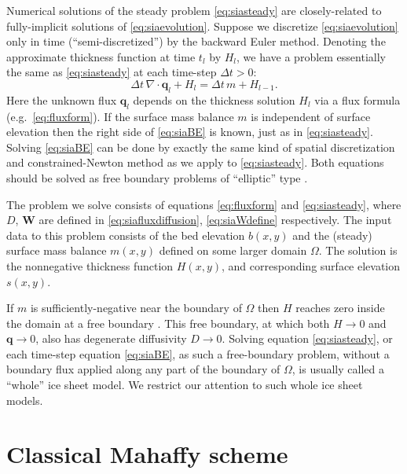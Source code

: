 \documentclass[twocolumn,letterpaper]{igs}
\newcommand\bq{\mathbf{q}}
\newcommand\bW{\mathbf{W}}
\newcommand{\Div}{\nabla\cdot}
\begin{document}
Numerical solutions of the steady problem \eqref{eq:siasteady} are closely-related to fully-implicit  solutions of \eqref{eq:siaevolution}.  Suppose we discretize \eqref{eq:siaevolution} only in time (``semi-discretized'') by the backward Euler method.  Denoting the approximate thickness function at time $t_l$ by $H_l$, we have a problem essentially the same as \eqref{eq:siasteady} at each time-step $\Delta t> 0$:
\begin{equation}
\Delta t\,\Div \bq_l + H_l = \Delta t\,m + H_{l-1}.  \label{eq:siaBE}
\end{equation}
Here the unknown flux $\bq_l$ depends on the thickness solution $H_l$ via a flux formula (e.g.~\eqref{eq:fluxform}).  If the surface mass balance $m$ is independent of surface elevation then the right side of \eqref{eq:siaBE} is known, just as in \eqref{eq:siasteady}.  Solving \eqref{eq:siaBE} can be done by exactly the same kind of spatial discretization and constrained-Newton method as we apply to \eqref{eq:siasteady}.  Both equations should be solved as free boundary problems of ``elliptic'' type \citep{JouvetBueler2012}.

The problem we solve consists of equations \eqref{eq:fluxform} and \eqref{eq:siasteady}, where $D$, $\bW$ are defined in \eqref{eq:siafluxdiffusion}, \eqref{eq:siaWdefine} respectively.  The input data to this problem consists of the bed elevation $b(x,y)$ and the (steady) surface mass balance $m(x,y)$ defined on some larger domain $\Omega$.  The solution is the nonnegative thickness function $H(x,y)$, and corresponding surface elevation $s(x,y)$.

If $m$ is sufficiently-negative near the boundary of $\Omega$ then $H$ reaches zero inside the domain at a free boundary \citep{JouvetBueler2012}.  This free boundary, at which both $H\to 0$ and $\bq \to 0$, also has degenerate diffusivity $D \to 0$.  Solving equation \eqref{eq:siasteady}, or each time-step equation \eqref{eq:siaBE}, as such a free-boundary problem, without a boundary flux applied along any part of the boundary of $\Omega$, is usually called a ``whole'' ice sheet model.  We restrict our attention to such whole ice sheet models.


\section{Classical Mahaffy scheme}   \label{sec:mahaffyfd}
\end{document}
